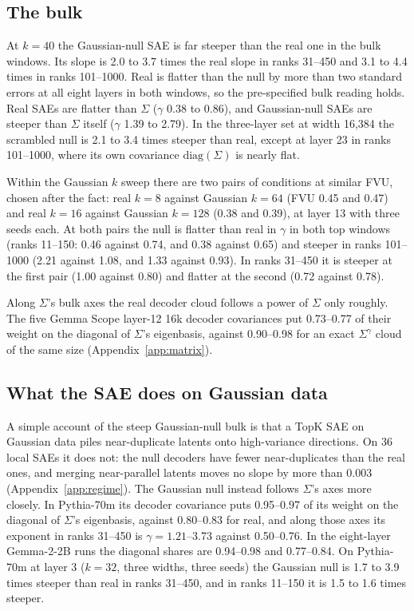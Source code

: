 \documentclass[10pt,twocolumn]{article}
\newcommand{\Sig}{\Sigma}
\begin{document}
\subsection{The bulk}
\label{app:gbulk}

At $k=40$ the Gaussian-null SAE is far steeper than the real one in the bulk windows. Its slope is 2.0 to 3.7 times the real slope in ranks 31--450 and 3.1 to 4.4 times in ranks 101--1000. Real is flatter than the null by more than two standard errors at all eight layers in both windows, so the pre-specified bulk reading holds. Real SAEs are flatter than $\Sig$ ($\gamma$ 0.38 to 0.86), and Gaussian-null SAEs are steeper than $\Sig$ itself ($\gamma$ 1.39 to 2.79). In the three-layer set at width 16,384 the scrambled null is 2.1 to 3.4 times steeper than real, except at layer 23 in ranks 101--1000, where its own covariance $\mathrm{diag}(\Sig)$ is nearly flat.

Within the Gaussian $k$ sweep there are two pairs of conditions at similar FVU, chosen after the fact: real $k=8$ against Gaussian $k=64$ (FVU 0.45 and 0.47) and real $k=16$ against Gaussian $k=128$ (0.38 and 0.39), at layer 13 with three seeds each. At both pairs the null is flatter than real in $\gamma$ in both top windows (ranks 11--150: 0.46 against 0.74, and 0.38 against 0.65) and steeper in ranks 101--1000 (2.21 against 1.08, and 1.33 against 0.93). In ranks 31--450 it is steeper at the first pair (1.00 against 0.80) and flatter at the second (0.72 against 0.78).

Along $\Sig$'s bulk axes the real decoder cloud follows a power of $\Sig$ only roughly. The five Gemma Scope layer-12 16k decoder covariances put 0.73--0.77 of their weight on the diagonal of $\Sig$'s eigenbasis, against 0.90--0.98 for an exact $\Sig^{\gamma}$ cloud of the same size (Appendix~\ref{app:matrix}).

\subsection{What the SAE does on Gaussian data}
\label{app:gregime}

A simple account of the steep Gaussian-null bulk is that a TopK SAE on Gaussian data piles near-duplicate latents onto high-variance directions. On 36 local SAEs it does not: the null decoders have fewer near-duplicates than the real ones, and merging near-parallel latents moves no slope by more than 0.003 (Appendix~\ref{app:regime}). The Gaussian null instead follows $\Sig$'s axes more closely. In Pythia-70m its decoder covariance puts 0.95--0.97 of its weight on the diagonal of $\Sig$'s eigenbasis, against 0.80--0.83 for real, and along those axes its exponent in ranks 31--450 is $\gamma=1.21$--3.73 against 0.50--0.76. In the eight-layer Gemma-2-2B runs the diagonal shares are 0.94--0.98 and 0.77--0.84. On Pythia-70m at layer 3 ($k=32$, three widths, three seeds) the Gaussian null is 1.7 to 3.9 times steeper than real in ranks 31--450, and in ranks 11--150 it is 1.5 to 1.6 times steeper.
\end{document}
